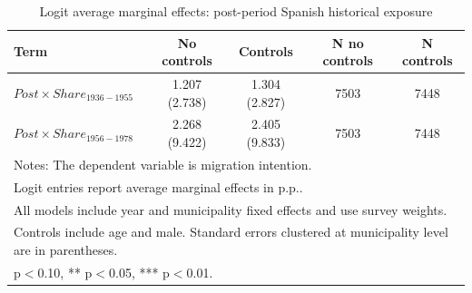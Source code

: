 \begin{table}[!htbp]
\centering
\caption{Logit average marginal effects: post-period Spanish historical exposure}
\label{tab:logit_post_share_mfx}
\small
\begin{tabular}{lcccc}
\hline
Term & No controls & Controls & N no controls & N controls \\
\hline
$Post \times Share_{1936-1955}$ & 1.207 (2.738) & 1.304 (2.827) & 7503 & 7448 \\
$Post \times Share_{1956-1978}$ & 2.268 (9.422) & 2.405 (9.833) & 7503 & 7448 \\
\hline
\multicolumn{5}{l}{\footnotesize Notes: The dependent variable is migration intention.} \\
\multicolumn{5}{l}{\footnotesize Logit entries report average marginal effects in p.p..} \\
\multicolumn{5}{l}{\footnotesize All models include year and municipality fixed effects and use survey weights.} \\
\multicolumn{5}{l}{\footnotesize Controls include age and male. Standard errors clustered at municipality level are in parentheses.} \\
\multicolumn{5}{l}{\footnotesize * p$<$0.10, ** p$<$0.05, *** p$<$0.01.} \\
\end{tabular}
\end{table}
